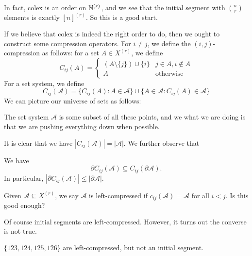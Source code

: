 \documentclass[a4paper]{article}
\begin{document}
In fact, colex is an order on $\mathbb{N}^{(r)}$, and we see that the initial segment with $\binom{n}{r}$ elements is exactly $[n]^{(r)}$. So this is a good start.

If we believe that colex is indeed the right order to do, then we ought to construct some compression operators. For $i \not= j$, we define the $(i, j)$-compression as follows: for a set $A \in X^{(r)}$, we define
\[
  C_{ij}(A) =
  \begin{cases}
    (A \setminus \{j\}) \cup \{i\} & j \in A, i \not\in A\\
    A & \text{otherwise}
  \end{cases}
\]
For a set system, we define
\[
  C_{ij}(\mathcal{A}) = \{C_{ij}(A): A \in \mathcal{A}\} \cup \{A \in \mathcal{A}:C_{ij}(A) \in \mathcal{A}\}
\]
We can picture our universe of sets as follows:
\begin{center}
\end{center}
The set system $\mathcal{A}$ is some subset of all these points, and we what we are doing is that we are pushing everything down when possible.

It is clear that we have $|C_{ij}(\mathcal{A})| = |\mathcal{A}|$. We further observe that

\begin{lemma}
  We have
  \[
    \partial C_{ij}(\mathcal{A}) \subseteq C_{ij}(\partial \mathcal{A}).
  \]
  In particular, $|\partial C_{ij}(\mathcal{A})| \leq |\partial \mathcal{A}|$.\fakeqed
\end{lemma}

Given $\mathcal{A} \subseteq X^{(r)}$, we say $\mathcal{A}$ is left-compressed if $c_{ij}(\mathcal{A}) = \mathcal{A}$ for all $i < j$. Is this good enough?

Of course initial segments are left-compressed. However, it turns out the converse is not true.

\begin{eg}
  $\{123, 124, 125, 126\}$ are left-compressed, but not an initial segment.
\end{eg}
\end{document}
